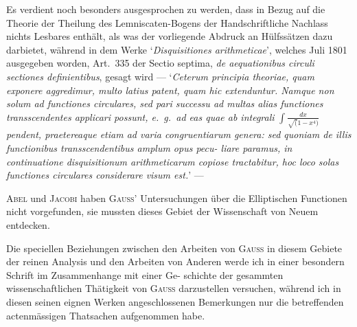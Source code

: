\documentclass[12pt,a4paper]{article}
\begin{document}
Es verdient noch besonders ausgesprochen zu werden, dass in Bezug auf die Theorie der Theilung
des Lemniscaten-Bogens der Handschriftliche Nachlass nichts Lesbares enth\"alt, als was der vorliegende
Abdruck an H\"ulfss\"atzen dazu darbietet, w\"ahrend in dem Werke `\textit{Disquisitiones arithmeticae}', welches Juli
1801 ausgegeben worden, Art.~335 der Sectio septima, \textit{de aequationibus circuli sectiones definientibus},
gesagt wird --- `\textit{Ceterum principia theoriae, quam exponere aggredimur, multo latius patent, quam hic\linebreak
\hspace*{\fill} extenduntur. Namque non solum ad functiones circulares, sed pari successu ad multas alias functiones\linebreak
\hspace*{\fill} transscendentes applicari possunt, e.\ g.\ ad eas quae ab integrali} $\displaystyle\int\!\frac{dx}{\surd(1-x^4)}$ \textit{pendent, praeterea\-que etiam\linebreak
\hspace*{\fill} ad varia congruentiarum genera: sed quoniam de illis functionibus transscendentibus amplum opus pecu-\linebreak
\hspace*{\fill} liare paramus, in continuatione disquisitionum arithmeticarum copiose tractabitur, hoc loco solas\linebreak
\hspace*{\fill} functiones circulares considerare visum est.}' ---

\textsc{Abel} und \textsc{Jacobi} haben \textsc{Gau\ss}' Untersuchungen \"uber die Elliptischen Functionen nicht vorgefunden,
sie mussten dieses Gebiet der Wissenschaft von Neuem entdecken.

Die speciellen Beziehungen zwischen den Arbeiten von \textsc{Gau\ss} in diesem Gebiete der reinen Analysis
und den Arbeiten von Anderen werde ich in einer besondern Schrift im Zusammenhange mit einer Ge-\linebreak
\hspace*{\fill} schichte der gesammten wissenschaftlichen Th\"atigkeit von \textsc{Gau\ss} darzustellen versuchen, w\"ahrend ich in\linebreak
\hspace*{\fill} diesen seinen eignen Werken angeschlossenen Bemerkungen nur die betreffenden actenm\"assigen Thatsachen\linebreak
\hspace*{\fill} aufgenommen habe.
\end{document}
